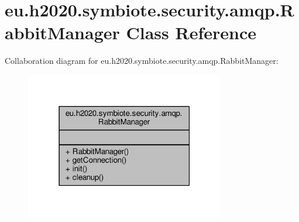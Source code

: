 \hypertarget{classeu_1_1h2020_1_1symbiote_1_1security_1_1amqp_1_1RabbitManager}{}\section{eu.\+h2020.\+symbiote.\+security.\+amqp.\+Rabbit\+Manager Class Reference}
\label{classeu_1_1h2020_1_1symbiote_1_1security_1_1amqp_1_1RabbitManager}


Collaboration diagram for eu.\+h2020.\+symbiote.\+security.\+amqp.\+Rabbit\+Manager\+:
\nopagebreak
\begin{figure}[H]
\begin{center}
\leavevmode
\includegraphics[width=247pt]{classeu_1_1h2020_1_1symbiote_1_1security_1_1amqp_1_1RabbitManager__coll__graph}
\end{center}
\end{figure}
